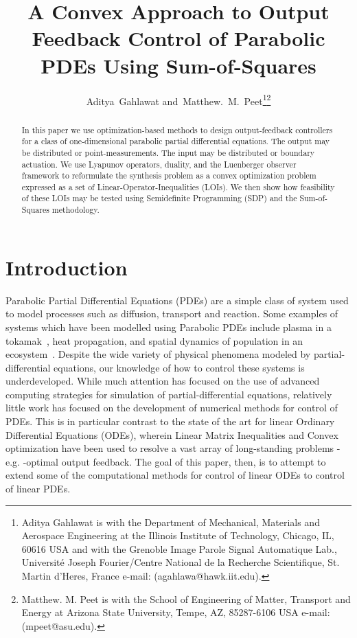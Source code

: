 \documentclass[9pt,journal,twocolumn]{IEEEtran}
\begin{document}
\title{A Convex Approach to Output Feedback Control of Parabolic PDEs Using Sum-of-Squares}


\author{Aditya~Gahlawat
         and~Matthew.~M.~Peet\thanks{Aditya Gahlawat is with the Department
of Mechanical, Materials and Aerospace Engineering at the Illinois Institute of Technology, Chicago,
IL, 60616 USA and with the Grenoble Image Parole Signal Automatique Lab., Universit\'{e} Joseph Fourier/Centre National de la Recherche Scientifique, St. Martin d'Heres, France e-mail: (agahlawa@hawk.iit.edu).}\thanks{Matthew. M. Peet is with the School of Engineering of Matter, Transport and Energy at Arizona State University, Tempe, AZ, 85287-6106 USA e-mail: (mpeet@asu.edu).}}










\maketitle

\begin{abstract}
In this paper we use optimization-based methods to design output-feedback controllers for a class of one-dimensional parabolic partial differential equations. The output may be distributed or point-measurements. The input may be distributed or boundary actuation. We use Lyapunov operators, duality, and the Luenberger observer framework to reformulate the synthesis problem as a convex optimization problem expressed as a set of Linear-Operator-Inequalities (LOIs). We then show how feasibility of these LOIs may be tested using Semidefinite Programming (SDP) and the Sum-of-Squares methodology.
\end{abstract}
\IEEEpeerreviewmaketitle

\section{Introduction}

Parabolic Partial Differential Equations (PDEs) are a simple class of system used to model processes such as diffusion, transport and reaction.  Some examples of systems which have been modelled using Parabolic PDEs include plasma in a tokamak~\cite{witrant2007control}, heat propagation, and spatial dynamics of population in an ecosystem~\cite{murray2002mathematical}. Despite the wide variety of physical phenomena modeled by partial-differential equations, our knowledge of how to control these systems is underdeveloped. While much attention has focused on the use of advanced computing strategies for simulation of partial-differential equations, relatively little work has focused on the development of numerical methods for control of PDEs. This is in particular contrast to the state of the art for linear Ordinary Differential Equations (ODEs), wherein Linear Matrix Inequalities and Convex optimization have been used to resolve a vast array of long-standing problems - e.g. -optimal output feedback. The goal of this paper, then, is to attempt to extend some of the computational methods for control of linear ODEs to control of linear PDEs.
\end{document}
